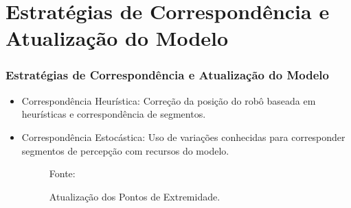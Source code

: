 \documentclass[xcolor=dvipsnames, aspectratio=169]{beamer}
\begin{document}
\section{Estratégias de Correspondência e Atualização do Modelo}
  \begin{frame}
  \frametitle{Estratégias de Correspondência e Atualização do Modelo}
  \begin{itemize}
      \item Correspondência Heurística: Correção da posição do robô baseada em heurísticas e correspondência de segmentos.
      \item Correspondência Estocástica: Uso de variações conhecidas para corresponder segmentos de percepção com recursos do modelo.

      \begin{figure}
        \centering
        {Fonte: \cite{buniyamin2011simple}}
        \caption{Atualização dos Pontos de Extremidade.}
        \label{fig:5}
      \end{figure}


\end{itemize}
\end{frame}
\end{document}
